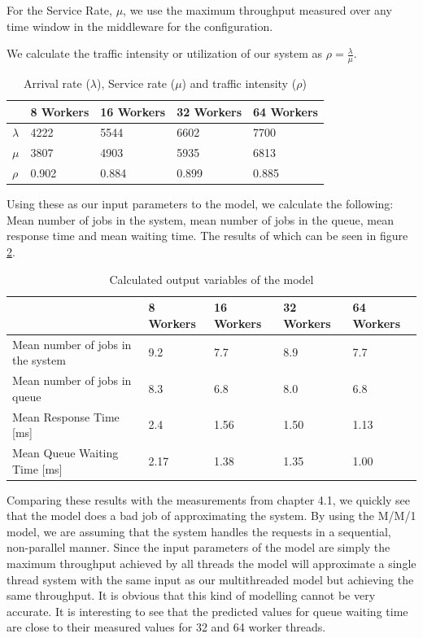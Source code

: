 \documentclass[11pt,a4paper]{article}
\begin{document}
For the Service Rate, $\mu$, we use the maximum throughput measured over any time window in the middleware for the configuration.

We calculate the traffic intensity or utilization of our system as $\rho = \frac{\lambda}{\mu}$.\\

\begin{table}[h]
\centering
\caption{Arrival rate ($\lambda$), Service rate ($\mu$) and traffic intensity ($\rho$)}
\label{table:arrivalrate}
\begin{tabular}{l|llll}
          & 8 Workers & 16 Workers & 32 Workers & 64 Workers \\ \hline
$\lambda$ & 4222      & 5544       & 6602       & 7700       \\
$\mu$     & 3807    & 4903     & 5935     & 6813    \\
$\rho$    & 0.902     & 0.884      & 0.899      & 0.885     
\end{tabular}
\end{table}

Using these as our input parameters to the model, we calculate the following: Mean number of jobs in the system, mean number of jobs in the queue, mean response time and mean waiting time. The results of which can be seen in figure \ref{table:mm1}.

\begin{table}[h]
\centering
\caption{Calculated output variables of the model}
\label{table:mm1}
\begin{tabular}{l|llll}
                                  & 8 Workers & 16 Workers & 32 Workers & 64 Workers \\ \hline
Mean number of jobs in the system & 9.2       & 7.7        & 8.9        & 7.7        \\
Mean number of jobs in queue      & 8.3       & 6.8        & 8.0        & 6.8        \\
Mean Response Time {[}ms{]}       & 2.4       & 1.56       & 1.50       & 1.13       \\
Mean Queue Waiting Time {[}ms{]}        & 2.17      & 1.38       & 1.35       & 1.00      
\end{tabular}
\end{table}

Comparing these results with the measurements from chapter 4.1, we quickly see that the model does a bad job of approximating the system. By using the M/M/1 model, we are assuming that the system handles the requests in a sequential, non-parallel manner. Since the input parameters of the model are simply the maximum throughput achieved by all threads the model will approximate a single thread system with the same input as our multithreaded model but achieving the same throughput. It is obvious that this kind of modelling cannot be very accurate. It is interesting to see that the predicted values for queue waiting time are close to their measured values for 32 and 64 worker threads.
\end{document}
